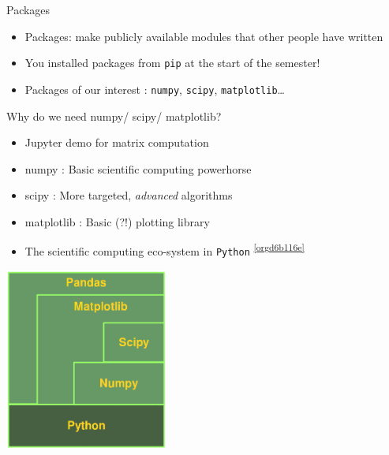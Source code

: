 \documentclass[presentation]{beamer}
\begin{document}
\begin{frame}[label={sec:org14e867b},fragile]{Packages}
 \begin{itemize}
\item Packages: make publicly available modules that other people have written
\item You installed packages from \texttt{pip} at the start of the semester!
\item Packages of our interest : \texttt{numpy}, \texttt{scipy}, \texttt{matplotlib}\ldots{}
\end{itemize}
\end{frame}
\begin{frame}[label={sec:orgcfa7b49},fragile]{Why do we need numpy/ scipy/ matplotlib?}
 \begin{itemize}
\item \alert{Jupyter demo} for matrix computation
\item \alert{numpy} : Basic scientific computing powerhorse
\item \alert{scipy} : More targeted, \emph{advanced} algorithms
\item \alert{matplotlib} : Basic (?!) plotting library
\item The scientific computing eco-system in \texttt{Python} \textsuperscript{\ref{orgd6b116e}}
\end{itemize}
\begin{center}
\includegraphics[width=0.4\textwidth]{images/python_numerics.png}
\end{center}
\end{frame}

\end{document}
